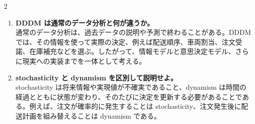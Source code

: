 \begin{multicols}{2}
\begin{enumerate}
\item \textbf{DDDM は通常のデータ分析と何が違うか。}\\
通常のデータ分析は、過去データの説明や予測で終わることがある。DDDMでは、その情報を使って実際の決定、例えば配送順序、車両割当、注文受諾、在庫補充などを選ぶ。したがって、情報モデルと意思決定モデル、さらに現実への実装までを一体として考える。
\item \textbf{stochasticity と dynamism を区別して説明せよ。}\\
stochasticity は将来情報や実現値が不確実であること、dynamism は時間の経過とともに状態が変わり、そのたびに決定を更新する必要があることである。例えば、注文が確率的に発生することは stochasticity、注文発生後に配送計画を組み替えることは dynamism である。
\end{enumerate}

\end{multicols}

\clearpage



\vspace{1.5mm}

